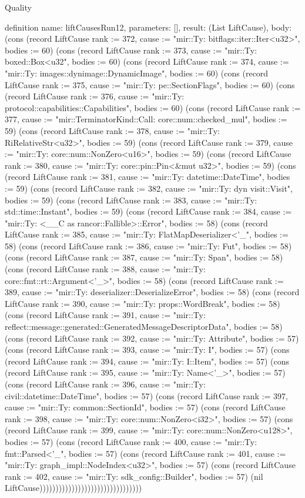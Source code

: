 \begin{lexlean}{Quality}
\begin{semanticmodule}
definition{
  name: liftCausesRun12,
  parameters: [],
  result: (List LiftCause),
  body: (cons (record LiftCause {rank := 372, cause := "mir::Ty: bitflags::iter::Iter<u32>", bodies := 60}) (cons (record LiftCause {rank := 373, cause := "mir::Ty: boxed::Box<u32", bodies := 60}) (cons (record LiftCause {rank := 374, cause := "mir::Ty: images::dynimage::DynamicImage", bodies := 60}) (cons (record LiftCause {rank := 375, cause := "mir::Ty: pe::SectionFlags", bodies := 60}) (cons (record LiftCause {rank := 376, cause := "mir::Ty: protocol::capabilities::Capabilities", bodies := 60}) (cons (record LiftCause {rank := 377, cause := "mir::TerminatorKind::Call: core::num::checked_mul", bodies := 59}) (cons (record LiftCause {rank := 378, cause := "mir::Ty: RiRelativeStr<u32>", bodies := 59}) (cons (record LiftCause {rank := 379, cause := "mir::Ty: core::num::NonZero<u16>", bodies := 59}) (cons (record LiftCause {rank := 380, cause := "mir::Ty: core::pin::Pin<&mut u32>", bodies := 59}) (cons (record LiftCause {rank := 381, cause := "mir::Ty: datetime::DateTime", bodies := 59}) (cons (record LiftCause {rank := 382, cause := "mir::Ty: dyn visit::Visit", bodies := 59}) (cons (record LiftCause {rank := 383, cause := "mir::Ty: std::time::Instant", bodies := 59}) (cons (record LiftCause {rank := 384, cause := "mir::Ty: <__C as rancor::Fallible>::Error", bodies := 58}) (cons (record LiftCause {rank := 385, cause := "mir::Ty: FlatMapDeserializer<'_", bodies := 58}) (cons (record LiftCause {rank := 386, cause := "mir::Ty: Fut", bodies := 58}) (cons (record LiftCause {rank := 387, cause := "mir::Ty: Span", bodies := 58}) (cons (record LiftCause {rank := 388, cause := "mir::Ty: core::fmt::rt::Argument<'_>", bodies := 58}) (cons (record LiftCause {rank := 389, cause := "mir::Ty: deserializer::DeserializeError", bodies := 58}) (cons (record LiftCause {rank := 390, cause := "mir::Ty: props::WordBreak", bodies := 58}) (cons (record LiftCause {rank := 391, cause := "mir::Ty: reflect::message::generated::GeneratedMessageDescriptorData", bodies := 58}) (cons (record LiftCause {rank := 392, cause := "mir::Ty: Attribute", bodies := 57}) (cons (record LiftCause {rank := 393, cause := "mir::Ty: I", bodies := 57}) (cons (record LiftCause {rank := 394, cause := "mir::Ty: I::Item", bodies := 57}) (cons (record LiftCause {rank := 395, cause := "mir::Ty: Name<'_>", bodies := 57}) (cons (record LiftCause {rank := 396, cause := "mir::Ty: civil::datetime::DateTime", bodies := 57}) (cons (record LiftCause {rank := 397, cause := "mir::Ty: common::SectionId", bodies := 57}) (cons (record LiftCause {rank := 398, cause := "mir::Ty: core::num::NonZero<i32>", bodies := 57}) (cons (record LiftCause {rank := 399, cause := "mir::Ty: core::num::NonZero<u128>", bodies := 57}) (cons (record LiftCause {rank := 400, cause := "mir::Ty: fmt::Parsed<'_", bodies := 57}) (cons (record LiftCause {rank := 401, cause := "mir::Ty: graph_impl::NodeIndex<u32>", bodies := 57}) (cons (record LiftCause {rank := 402, cause := "mir::Ty: sdk_config::Builder", bodies := 57}) (nil LiftCause))))))))))))))))))))))))))))))))
}


\end{semanticmodule}
\end{lexlean}
